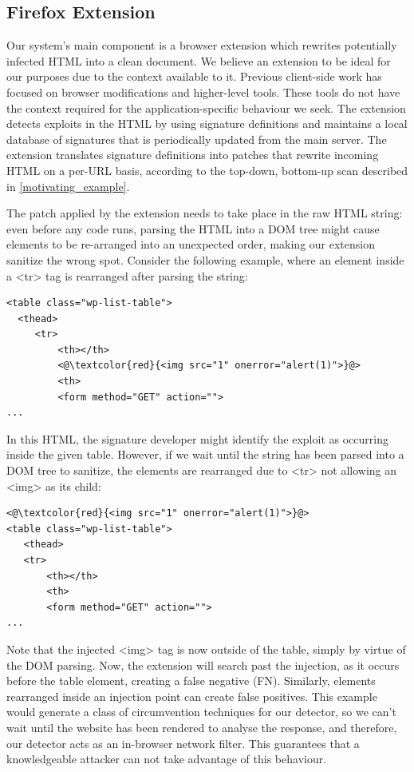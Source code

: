  \subsection{Firefox Extension} \label{firefox_extension}
 Our system's main component is a browser extension which rewrites potentially infected HTML into a clean document. We believe an extension to be ideal for our purposes due to the context available to it. Previous client-side work has focused on browser modifications and higher-level tools. These tools do not have the context required for the application-specific behaviour we seek. The extension detects exploits in the HTML by using signature definitions and maintains a local database of signatures that is periodically updated from the main server. The extension translates signature definitions into patches that rewrite incoming HTML on a per-URL basis, according to the top-down, bottom-up scan described in \autoref{motivating_example}. 

The patch applied by the extension needs to take place in the raw HTML string: even before any code runs, parsing the HTML into a DOM tree might cause elements to be re-arranged into an unexpected order, making our extension sanitize the wrong spot. 
Consider the following example, where an element inside a <tr> tag is rearranged after parsing the string:

\begin{lstlisting}
<table class="wp-list-table">
  <thead>
     <tr>
	     <th></th>
	     <@\textcolor{red}{<img src="1" onerror="alert(1)">}@>
	     <th>
   	     <form method="GET" action="">
...
\end{lstlisting}

In this HTML, the signature developer might identify the exploit as occurring inside the given table. However, if we wait until the string has been parsed into a DOM tree to sanitize, the elements are rearranged due to <tr> not allowing an <img> as its child:

\begin{lstlisting}
<@\textcolor{red}{<img src="1" onerror="alert(1)">}@>
<table class="wp-list-table">
   <thead>
   <tr>
	   <th></th>
	   <th>
       <form method="GET" action="">
...
\end{lstlisting}

Note that the injected <img> tag is now outside of the table, simply by virtue of the DOM parsing. Now, the extension will search past the injection, as it occurs before the table element, creating a false negative (FN). Similarly, elements rearranged inside an injection point can create false positives. This example would generate a class of circumvention techniques for our detector, so we can't wait until the website has been rendered to analyse the response, and therefore, our detector acts as an in-browser network filter. This guarantees that a knowledgeable attacker can not take advantage of this behaviour.

